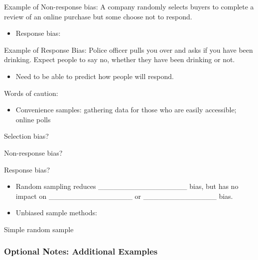 \documentclass[
]{report}
\providecommand{\tightlist}{%
  \setlength{\itemsep}{0pt}\setlength{\parskip}{0pt}}
\newcommand{\rgi}{\hspace{24pt}}  %
\begin{document}
Example of Non-response bias: A company randomly selects buyers to complete a review of an online purchase but some choose not to respond.

\begin{itemize}
\tightlist
\item
  Response bias:
\end{itemize}

\vspace{0.5in}

Example of Response Bias: Police officer pulls you over and asks if you have been drinking. Expect people to say no, whether they have been drinking or not.

\begin{itemize}
\tightlist
\item
  Need to be able to predict how people will respond.
\end{itemize}

Words of caution:

\begin{itemize}
\tightlist
\item
  Convenience samples: gathering data for those who are easily accessible; online polls
\end{itemize}


\rgi \rgi Selection bias?

\rgi \rgi Non-response bias?

\rgi \rgi Response bias?

\begin{itemize}
\tightlist
\item
  Random sampling reduces \_\_\_\_\_\_\_\_\_\_\_\_\_\_\_\_\_ bias, but has no impact on \_\_\_\_\_\_\_\_\_\_\_\_\_\_\_\_ or \_\_\_\_\_\_\_\_\_\_\_\_\_\_ bias.
\end{itemize}


\begin{itemize}
\tightlist
\item
  Unbiased sample methods:
\end{itemize}

\vspace{0.5in}

\rgi \rgi Simple random sample

\subsubsection*{Optional Notes: Additional Examples}\label{optional-notes-additional-examples}
\end{document}

